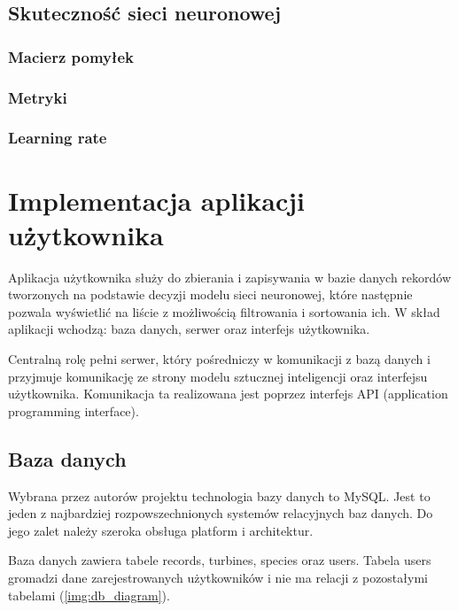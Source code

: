 \documentclass{sprz}
\begin{document}
\section{Skuteczność sieci neuronowej}

\subsection{Macierz pomyłek}

\subsection{Metryki}

\subsection{Learning rate}

\chapter{Implementacja aplikacji użytkownika}

Aplikacja użytkownika służy do zbierania i zapisywania w bazie danych rekordów tworzonych na podstawie decyzji modelu sieci neuronowej, które następnie pozwala wyświetlić na liście z możliwością filtrowania i sortowania ich. W skład aplikacji wchodzą: baza danych, serwer oraz interfejs użytkownika.

Centralną rolę pełni serwer, który pośredniczy w komunikacji z bazą danych i przyjmuje komunikację ze strony modelu sztucznej inteligencji oraz interfejsu użytkownika. Komunikacja ta realizowana jest poprzez interfejs API (application programming interface).
\clearpage

\section{Baza danych}

Wybrana przez autorów projektu technologia bazy danych to MySQL. Jest to jeden z najbardziej rozpowszechnionych systemów relacyjnych baz danych. Do jego zalet należy szeroka obsługa platform i architektur.

Baza danych zawiera tabele records, turbines, species oraz users. Tabela users gromadzi dane zarejestrowanych użytkowników i nie ma relacji z pozostałymi tabelami (\ref{img:db_diagram}).
\end{document}
